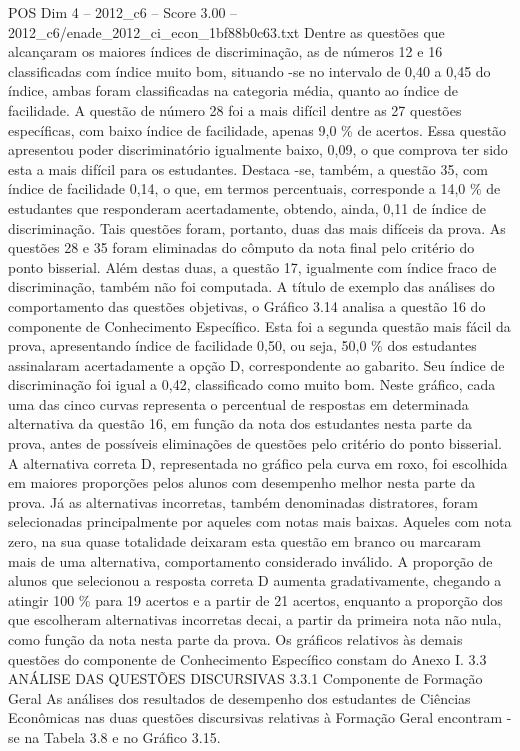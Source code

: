 \begin{textsample}{POS Dim 4 – 2012\_c6 – Score 3.00 – 2012\_c6/enade\_2012\_ci\_econ\_1bf88b0c63.txt}
Dentre as questões que alcançaram os maiores índices de discriminação, as de números 12 e 16 classificadas com índice muito bom, situando -se no intervalo de 0,40 a 0,45 do índice, ambas foram classificadas na categoria média, quanto ao índice de facilidade.
A questão de número 28 foi a mais difícil dentre as 27 questões específicas, com baixo índice de facilidade, apenas 9,0 \% de acertos.
Essa questão apresentou poder discriminatório igualmente baixo, 0,09, o que comprova ter sido esta a mais difícil para os estudantes.
Destaca -se, também, a questão 35, com índice de facilidade 0,14, o que, em termos percentuais, corresponde a 14,0 \% de estudantes que responderam acertadamente, obtendo, ainda, 0,11 de índice de discriminação.
Tais questões foram, portanto, duas das mais difíceis da prova.
As questões 28 e 35 foram eliminadas do cômputo da nota final pelo critério do ponto bisserial.
Além destas duas, a questão 17, igualmente com índice fraco de discriminação, também não foi computada.
A título de exemplo das análises do comportamento das questões objetivas, o Gráfico 3.14 analisa a questão 16 do componente de Conhecimento Específico.
Esta foi a segunda questão mais fácil da prova, apresentando índice de facilidade 0,50, ou seja, 50,0 \% dos estudantes assinalaram acertadamente a opção D, correspondente ao gabarito.
Seu índice de discriminação foi igual a 0,42, classificado como muito bom.
Neste gráfico, cada uma das cinco curvas representa o percentual de respostas em determinada alternativa da questão 16, em função da nota dos estudantes nesta parte da prova, antes de possíveis eliminações de questões pelo critério do ponto bisserial.
A alternativa correta D, representada no gráfico pela curva em roxo, foi escolhida em maiores proporções pelos alunos com desempenho melhor nesta parte da prova.
Já as alternativas incorretas, também denominadas distratores, foram selecionadas principalmente por aqueles com notas mais baixas.
Aqueles com nota zero, na sua quase totalidade deixaram esta questão em branco ou marcaram mais de uma alternativa, comportamento considerado inválido.
A proporção de alunos que selecionou a resposta correta D aumenta gradativamente, chegando a atingir 100 \% para 19 acertos e a partir de 21 acertos, enquanto a proporção dos que escolheram alternativas incorretas decai, a partir da primeira nota não nula, como função da nota nesta parte da prova.
Os gráficos relativos às demais questões do componente de Conhecimento Específico constam do Anexo I. 3.3 ANÁLISE DAS QUESTÕES DISCURSIVAS 3.3.1 Componente de Formação Geral As análises dos resultados de desempenho dos estudantes de Ciências Econômicas nas duas questões discursivas relativas à Formação Geral encontram -se na Tabela 3.8 e no Gráfico 3.15.

\end{textsample}
